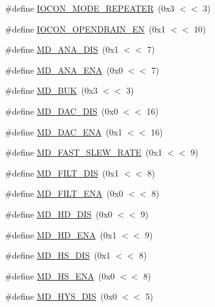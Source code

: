 \begin{DoxyCompactItemize}
\item 
\#define \hyperlink{group__IOCON__17XX__40XX_ga53d705841cc362c6f43ffc1370d71726}{I\+O\+C\+O\+N\+\_\+\+M\+O\+D\+E\+\_\+\+R\+E\+P\+E\+A\+T\+ER}~(0x3 $<$$<$ 3)
\item 
\#define \hyperlink{group__IOCON__17XX__40XX_ga226b54f672e61a7a2d2893d9ef8cbc9c}{I\+O\+C\+O\+N\+\_\+\+O\+P\+E\+N\+D\+R\+A\+I\+N\+\_\+\+EN}~(0x1 $<$$<$ 10)
\item 
\#define \hyperlink{group__IOCON__17XX__40XX_ga12c40f516d771be23c8521a59e8f37dd}{M\+D\+\_\+\+A\+N\+A\+\_\+\+D\+IS}~(0x1 $<$$<$ 7)
\item 
\#define \hyperlink{group__IOCON__17XX__40XX_ga981e8fc7f82693378a8856bea0b435b7}{M\+D\+\_\+\+A\+N\+A\+\_\+\+E\+NA}~(0x0 $<$$<$ 7)
\item 
\#define \hyperlink{group__IOCON__17XX__40XX_gaf637c444b0cbcd50aeaa4c4e34fbbd91}{M\+D\+\_\+\+B\+UK}~(0x3 $<$$<$ 3)
\item 
\#define \hyperlink{group__IOCON__17XX__40XX_gaec6eb0c4c1101d5c5dc64ef56a5a5588}{M\+D\+\_\+\+D\+A\+C\+\_\+\+D\+IS}~(0x0 $<$$<$ 16)
\item 
\#define \hyperlink{group__IOCON__17XX__40XX_ga6b38cbeca37aeb7bcbf7fc66ba4ec65d}{M\+D\+\_\+\+D\+A\+C\+\_\+\+E\+NA}~(0x1 $<$$<$ 16)
\item 
\#define \hyperlink{group__IOCON__17XX__40XX_ga26dcdaed2ef64f84991cc59ae9370c80}{M\+D\+\_\+\+F\+A\+S\+T\+\_\+\+S\+L\+E\+W\+\_\+\+R\+A\+TE}~(0x1 $<$$<$ 9)
\item 
\#define \hyperlink{group__IOCON__17XX__40XX_gad67d4495f8a8568bdedbaa13aceb2d3d}{M\+D\+\_\+\+F\+I\+L\+T\+\_\+\+D\+IS}~(0x1 $<$$<$ 8)
\item 
\#define \hyperlink{group__IOCON__17XX__40XX_ga0bbfc0ef84fc75d356d7fd36cd23527e}{M\+D\+\_\+\+F\+I\+L\+T\+\_\+\+E\+NA}~(0x0 $<$$<$ 8)
\item 
\#define \hyperlink{group__IOCON__17XX__40XX_ga324ed23a726e0788749899278b0ce61a}{M\+D\+\_\+\+H\+D\+\_\+\+D\+IS}~(0x0 $<$$<$ 9)
\item 
\#define \hyperlink{group__IOCON__17XX__40XX_ga4fb2c193dc83d6b18a8afad131b2e139}{M\+D\+\_\+\+H\+D\+\_\+\+E\+NA}~(0x1 $<$$<$ 9)
\item 
\#define \hyperlink{group__IOCON__17XX__40XX_gaa9af2984b24150d8c005e2b7c254adbc}{M\+D\+\_\+\+H\+S\+\_\+\+D\+IS}~(0x1 $<$$<$ 8)
\item 
\#define \hyperlink{group__IOCON__17XX__40XX_ga95de7405f0be07e5a3c1eac75663b7e4}{M\+D\+\_\+\+H\+S\+\_\+\+E\+NA}~(0x0 $<$$<$ 8)
\item 
\#define \hyperlink{group__IOCON__17XX__40XX_ga7c49147e8696b77ebf4bea2d90474a7f}{M\+D\+\_\+\+H\+Y\+S\+\_\+\+D\+IS}~(0x0 $<$$<$ 5)
$$
\end{DoxyCompactItemize}
